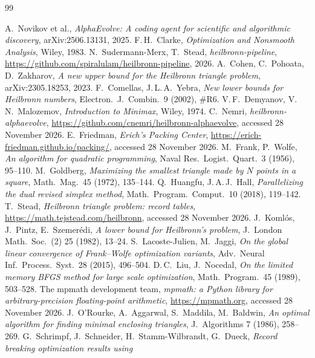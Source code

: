 \documentclass[11pt]{article}
\theoremstyle{remark}
\newcommand{\CodeURL}{\url{https://github.com/spiralulam/heilbronn-pipeline}}
\begin{document}
\begin{thebibliography}{99}\small\raggedright
{} A.~Novikov et al., \emph{AlphaEvolve: A coding agent for scientific and algorithmic discovery},
  arXiv:2506.13131, 2025.
 F.\,H.~Clarke, \emph{Optimization and Nonsmooth Analysis}, Wiley, 1983.
 N.~Sudermann-Merx, T.~Stead, \emph{heilbronn-pipeline}, \CodeURL{}, 2026.
 A.~Cohen, C.~Pohoata, D.~Zakharov, \emph{A new upper bound for the Heilbronn triangle problem},
  arXiv:2305.18253, 2023.
 F.~Comellas, J.\,L.\,A.~Yebra, \emph{New lower bounds for Heilbronn numbers},
  Electron.\ J.\ Combin.\ 9 (2002), \#R6.
 V.\,F.~Demyanov, V.\,N.~Malozemov, \emph{Introduction to Minimax}, Wiley, 1974.
 C.~Nemri, \emph{heilbronn-alphaevolve}, \url{https://github.com/cnemri/heilbronn-alphaevolve},
  accessed 28 November 2026.
 E.~Friedman, \emph{Erich's Packing Center}, \url{https://erich-friedman.github.io/packing/},
  accessed 28 November 2026.
 M.~Frank, P.~Wolfe, \emph{An algorithm for quadratic programming}, Naval Res.\ Logist.\ Quart.\ 3
  (1956), 95--110.
 M.~Goldberg, \emph{Maximizing the smallest triangle made by $N$ points in a square},
  Math.\ Mag.\ 45 (1972), 135--144.
 Q.~Huangfu, J.\,A.\,J.~Hall, \emph{Parallelizing the dual revised simplex method},
  Math.\ Program.\ Comput.\ 10 (2018), 119--142.
 T.~Stead, \emph{Heilbronn triangle problem: record tables}, \url{https://math.tejstead.com/heilbronn},
  accessed 28 November 2026.
 J.~Koml\'os, J.~Pintz, E.~Szemer\'edi, \emph{A lower bound for Heilbronn's problem},
  J.\ London Math.\ Soc.\ (2) 25 (1982), 13--24.
 S.~Lacoste-Julien, M.~Jaggi, \emph{On the global linear convergence of Frank--Wolfe optimization
  variants}, Adv.\ Neural Inf.\ Process.\ Syst.\ 28 (2015), 496--504.
 D.\,C.~Liu, J.~Nocedal, \emph{On the limited memory BFGS method for large scale optimization},
  Math.\ Program.\ 45 (1989), 503--528.
 The mpmath development team, \emph{mpmath: a Python library for arbitrary-precision floating-point
  arithmetic}, \url{https://mpmath.org}, accessed 28 November 2026.
 J.~O'Rourke, A.~Aggarwal, S.~Maddila, M.~Baldwin, \emph{An optimal algorithm for finding minimal
  enclosing triangles}, J.\ Algorithms 7 (1986), 258--269.
 G.~Schrimpf, J.~Schneider, H.~Stamm-Wilbrandt, G.~Dueck, \emph{Record breaking optimization results using
}
\end{thebibliography}
\end{document}

